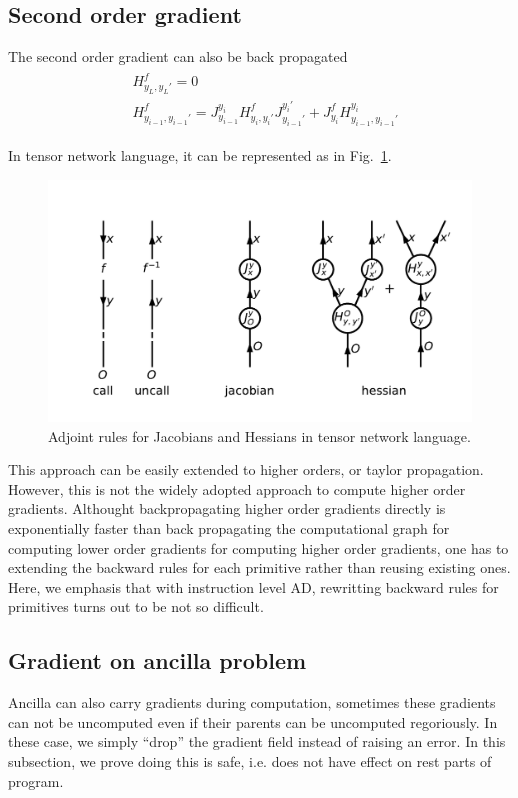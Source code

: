 \documentclass{article}
\newcommand{\<}{\langle}
\renewcommand{\>}{\rangle}
\newcommand{\Fig}[1]{Fig.~\ref{#1}}
\begin{document}
\subsection{Second order gradient}
The second order gradient can also be back propagated
\begin{align}
    \begin{split}
        &H^f_{y_L,y_L'} = 0\\
        &H^f_{y_{i-1},y_{i-1}'} = J^{y_i}_{y_{i-1}} H^f_{y_i, y_i'} J^{y_i'}_{y_{i-1}'} + J^f_{y_i} H^{y_i}_{y_{i-1}, y_{i-1}'}
    \end{split}
\end{align}

In tensor network language, it can be represented as in \Fig{fig:ad}.
\begin{figure}[h]
    \centerline{\includegraphics[width=\columnwidth,trim={0 1cm 0 1cm},clip]{images/ad.pdf}}
    \caption{Adjoint rules for Jacobians and Hessians in tensor network language.}\label{fig:ad}
\end{figure}

This approach can be easily extended to higher orders, or taylor propagation.
However, this is not the widely adopted approach to compute higher order gradients.
Althought backpropagating higher order gradients directly is exponentially faster than back propagating the computational graph for computing lower order gradients for computing higher order gradients, one has to extending the backward rules for each primitive rather than reusing existing ones.
Here, we emphasis that with instruction level AD, rewritting backward rules for primitives turns out to be not so difficult.

\subsection{Gradient on ancilla problem}
Ancilla can also carry gradients during computation, sometimes these gradients can not be uncomputed even if their parents can be uncomputed regoriously. In these case, we simply ``drop'' the gradient field instead of raising an error. In this subsection, we prove doing this is safe, i.e. does not have effect on rest parts of program.
\end{document}

